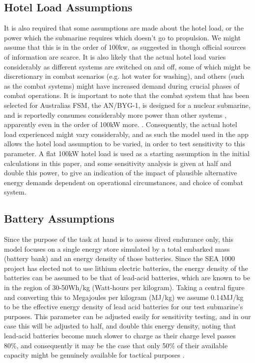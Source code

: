 \documentclass{article}\usepackage[]{graphicx}\usepackage[]{color}
\begin{document}
\subsection{Hotel Load Assumptions}
It is also required that some assumptions are made about the hotel load, or the power which the submarine requires which doesn't go to propulsion.  We might assume that this is in the order of 100kw, as suggested in \cite{martinez1995} though official sources of information are scarce.  It is also likely that the actual hotel load varies considerably as different systems are switched on and off, some of which might be discretionary in combat scenarios (e.g. hot water for washing), and others (such as the combat systems) might have increased demand during crucial phases of combat operations.  It is important to note that the combat system that has been selected for Australias FSM, the AN/BYG-1, is designed for a nuclear submarine, and is reportedly consumes considerably more power than other systems \cite{muir2015}, apparently even in the order of 100kW more. \cite{patrick2011}.  Consequently, the actual hotel load experienced might vary considerably, and as such the model used in the app allows the hotel load assumption to be varied, in order to test sensitivity to this parameter.  A flat 100kW hotel load is used as a starting assumption in the initial calculations in this paper, and some sensitivity analysis is given at half and double this power, to give an indication of the impact of plausible alternative energy demands dependent on operational circumstances, and choice of combat system.

\subsection{Battery Assumptions}
Since the purpose of the task at hand is to assess dived endurance only, this model focuses on a single energy store simulated by a total embarked mass (battery bank) and an energy density of those batteries.  Since the SEA 1000 project has elected not to use lithium electric batteries, the energy density of the batteries can be assumed to be that of lead-acid batteries, which are known to be in the region of 30-50Wh/kg (Watt-hours per kilogram).  Taking a central figure and converting this to Megajoules per kilogram (MJ/kg) we assume 0.14MJ/kg to be the effective energy density of lead acid batteries for our test submarine's purposes.  This parameter can be adjusted easily for sensitivity testing, and in our case this will be adjusted to half, and double this energy density, noting that lead-acid batteries become much slower to charge as their charge level passes 80\%, and consequently it may be the case that only 50\% of their available capacity might be genuinely available for tactical purposes \parencite{briggs2016}.
\end{document}
